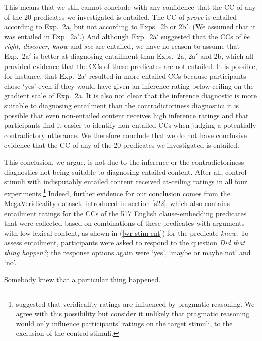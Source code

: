 \documentclass[11pt,fleqn]{article}
\newcommand{\6}{\mbox{$[\hspace*{-.6mm}[$}}
\newcommand{\9}{\mbox{$]\hspace*{-.6mm}]$}}
\begin{document}
{This means that we still cannot conclude with any confidence that the CC of any of the 20 predicates we investigated is entailed. The CC of {\em prove} is entailed according to Exp.~2a, but not according to Exps.~2b or 2b$'$. (We assumed that it was entailed in Exp.~2a$'$.) And although Exp.~2a$'$ suggested that the CCs of {\em be right, discover, know} and {\em see} are entailed, we have no reason to assume that Exp.~2a$'$ is better at diagnosing entailment than Exps.~2a, 2a$'$ and 2b, which all provided evidence that the CCs of these predicates are not entailed. It is possible, for instance, that Exp.~2a$'$ resulted in more entailed CCs because participants chose `yes' even if they would have given an inference rating below ceiling on the gradient scale of Exp.~2a. It is also not clear that the inference diagnostic is more suitable to diagnosing entailment than the contradictoriness diagnostic: it is possible that even non-entailed content receives high inference ratings and that participants find it easier to identify non-entailed CCs when judging a potentially contradictory utterance. We therefore conclude that we do not have conclusive evidence that the CC of any of the 20 predicates we investigated is entailed.

This conclusion, we argue, is not due to the inference or the contradictoriness diagnostics not being suitable to diagnosing entailed content. After all, control stimuli with indisputably entailed content received at-ceiling ratings in all four experiments.\footnote{\citet[329]{demarneffe-etal2012} suggested that veridicality ratings are influenced by pragmatic reasoning. We agree with this possibility but consider it unlikely that pragmatic reasoning would only influence participants' ratings on the target stimuli, to the exclusion of the control stimuli.} Indeed, further evidence for our conclusion comes from the MegaVeridicality dataset, introduced in section \ref{s22}, which also contains entailment ratings for the CCs of the 517 English clause-embedding predicates that were collected based on combinations of these predicates with arguments with low lexical content, as shown in (\ref{wr-stim-ent}) for the predicate {\em know}. To assess entailment, participants were asked to respond to the question {\em Did that thing happen?}; the response options again were `yes', `maybe or maybe not' and `no'. 

\begin{exe}
\ex\label{wr-stim-ent} Somebody knew that a particular thing happened.
\end{exe}

}
\end{document}
